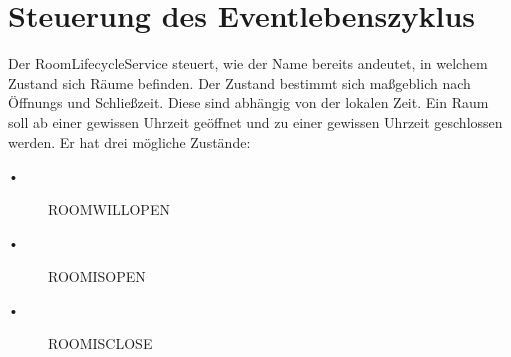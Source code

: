 \begin{table}[]
\caption{Struktur der Datenbanktabelle dbParticipant}
\label{tab:dbParticipant}
\centering
{}
\end{table}


\begin{table}[]
\caption{Struktur der Datenbanktabelle dbRoom}
\label{tab:dbRoom}
\end{table}

\section{Steuerung des Eventlebenszyklus}
\label{sec:RoomLifecycleService}
Der RoomLifecycleService steuert, wie der Name bereits andeutet, in welchem Zustand sich Räume befinden.
 Der Zustand bestimmt sich maßgeblich nach Öffnungs und Schließzeit.
Diese sind abhängig von der lokalen Zeit. Ein Raum soll ab einer gewissen Uhrzeit geöffnet und zu einer gewissen Uhrzeit geschlossen werden. 
Er hat drei mögliche Zustände:
\begin{description}
\item[•] ROOMWILLOPEN
\item[•] ROOMISOPEN
\item[•] ROOMISCLOSE
\end{description}

